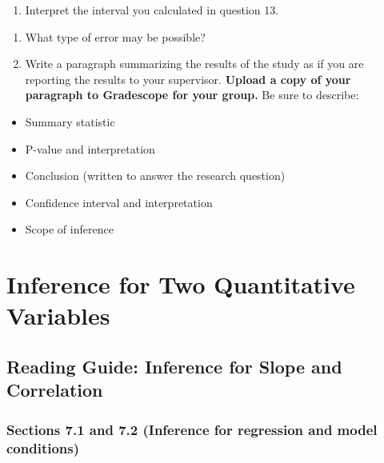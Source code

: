 \documentclass[
]{report}
\providecommand{\tightlist}{%
  \setlength{\itemsep}{0pt}\setlength{\parskip}{0pt}}
\begin{document}
\vspace{0.3in}

\begin{enumerate}
\def\labelenumi{\arabic{enumi}.}
\setcounter{enumi}{13}
\tightlist
\item
  Interpret the interval you calculated in question 13.
\end{enumerate}

\vspace{0.8in}

\begin{enumerate}
\def\labelenumi{\arabic{enumi}.}
\setcounter{enumi}{14}
\item
  What type of error may be possible?
  \vspace{0.2in}
\item
  Write a paragraph summarizing the results of the study as if you are reporting the results to your supervisor. \textbf{Upload a copy of your paragraph to Gradescope for your group.} Be sure to describe:
\end{enumerate}

\begin{itemize}
\item
  Summary statistic
\item
  P-value and interpretation
\item
  Conclusion (written to answer the research question)
\item
  Confidence interval and interpretation
\item
  Scope of inference
\end{itemize}

\vspace{3in}

\hypertarget{inference-for-two-quantitative-variables}{%
\chapter{Inference for Two Quantitative Variables}\label{inference-for-two-quantitative-variables}}

\hypertarget{reading-guide-inference-for-slope-and-correlation}{%
\section{Reading Guide: Inference for Slope and Correlation}\label{reading-guide-inference-for-slope-and-correlation}}

\hypertarget{sections-7.1-and-7.2-inference-for-regression-and-model-conditions}{%
\subsection*{Sections 7.1 and 7.2 (Inference for regression and model conditions)}\label{sections-7.1-and-7.2-inference-for-regression-and-model-conditions}}
\end{document}
